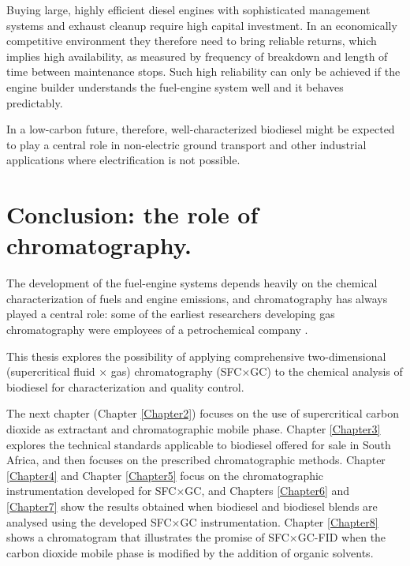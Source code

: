 Buying large, highly efficient diesel engines with sophisticated management
systems and exhaust cleanup require high capital investment. In an economically
competitive environment they therefore need to bring reliable returns, which
implies high availability, as measured by frequency of breakdown and length of
time between maintenance stops. Such high reliability can only be achieved if
the engine builder understands the fuel-engine system well and it behaves
predictably.

In a low-carbon future, therefore, well-characterized biodiesel might be
expected to play a central role in non-electric ground transport and other
industrial applications where electrification is not possible.

\section{Conclusion: the role of chromatography.}

The development of the fuel-engine systems depends heavily on the chemical
characterization of fuels and engine emissions, and chromatography has always
played a central role: some of the earliest researchers developing gas
chromatography were employees of a petrochemical company
\autocite{Keulemans1955}.

This thesis explores the possibility of applying comprehensive two-dimensional
(supercritical fluid × gas) chromatography (SFC×GC) to the chemical analysis of
biodiesel for characterization and quality control.

The next chapter (Chapter \ref{Chapter2}) focuses on the use of supercritical
carbon dioxide as extractant and chromatographic mobile phase. Chapter \ref{Chapter3}
explores the technical standards applicable to biodiesel offered for sale in
South Africa, and then focuses on the prescribed chromatographic methods.
Chapter \ref{Chapter4} and Chapter \ref{Chapter5} focus on the chromatographic
instrumentation developed for SFC×GC, and Chapters \ref{Chapter6} and
\ref{Chapter7} show the results obtained when biodiesel and biodiesel blends are
analysed using the developed SFC×GC instrumentation. Chapter \ref{Chapter8}
shows a chromatogram that illustrates the promise of SFC×GC-FID when the carbon
dioxide mobile phase is modified by the addition of organic solvents.